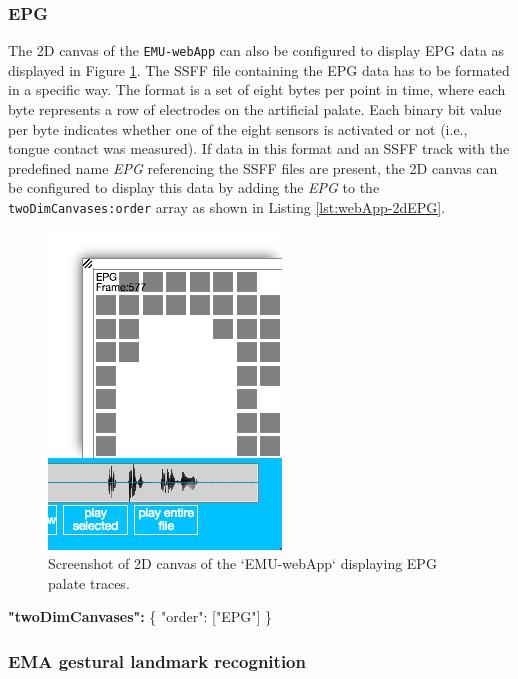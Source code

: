\documentclass[]{book}
\newenvironment{Shaded}{\begin{snugshade}}{\end{snugshade}}
\newcommand{\DataTypeTok}[1]{\textcolor[rgb]{0.13,0.29,0.53}{#1}}
\newcommand{\ErrorTok}[1]{\textcolor[rgb]{0.64,0.00,0.00}{\textbf{#1}}}
\newcommand{\FunctionTok}[1]{\textcolor[rgb]{0.00,0.00,0.00}{#1}}
\newcommand{\OtherTok}[1]{\textcolor[rgb]{0.56,0.35,0.01}{#1}}
\newcommand{\StringTok}[1]{\textcolor[rgb]{0.31,0.60,0.02}{#1}}
\begin{document}
\hypertarget{epg}{%
\subsubsection{EPG}\label{epg}}

The 2D canvas of the \texttt{EMU-webApp} can also be configured to display EPG data as displayed in Figure \ref{fig:webApp-2dEPG}. The SSFF file containing the EPG data has to be formated in a specific way. The format is a set of eight bytes per point in time, where each byte represents a row of electrodes on the artificial palate. Each binary bit value per byte indicates whether one of the eight sensors is activated or not (i.e., tongue contact was measured). If data in this format and an SSFF track with the predefined name \emph{EPG} referencing the SSFF files are present, the 2D canvas can be configured to display this data by adding the \emph{EPG} to the \texttt{twoDimCanvases:order} array as shown in Listing \ref{lst:webApp-2dEPG}.

\begin{figure}

{\centering \includegraphics[width=0.35\linewidth]{pics/emu-webApp2dEPG} 

}

\caption{Screenshot of 2D canvas of the `EMU-webApp` displaying EPG palate traces.}\label{fig:webApp-2dEPG}
\end{figure}

\begin{Shaded}
\begin{Highlighting}[]
\ErrorTok{"twoDimCanvases":} \FunctionTok{\{}
    \DataTypeTok{"order"}\FunctionTok{:} \OtherTok{[}\StringTok{"EPG"}\OtherTok{]}
\FunctionTok{\}}
\end{Highlighting}
\end{Shaded}

\hypertarget{ema-gestural-landmark-recognition}{%
\subsubsection{EMA gestural landmark recognition}\label{ema-gestural-landmark-recognition}}
\end{document}
